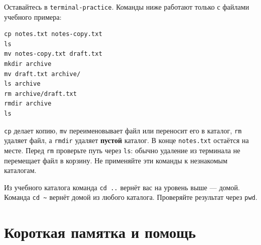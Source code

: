 Оставайтесь в \texttt{terminal-practice}. Команды ниже работают только с
файлами учебного примера:

\begin{verbatim}
cp notes.txt notes-copy.txt
ls
mv notes-copy.txt draft.txt
mkdir archive
mv draft.txt archive/
ls archive
rm archive/draft.txt
rmdir archive
ls
\end{verbatim}

\texttt{cp} делает копию, \texttt{mv} переименовывает файл или переносит
его в каталог, \texttt{rm} удаляет файл, а \texttt{rmdir} удаляет
\textbf{пустой} каталог. В конце \texttt{notes.txt} остаётся на месте.
Перед \texttt{rm} проверьте путь через \texttt{ls}: обычно удаление из
терминала не перемещает файл в корзину. Не применяйте эти команды к
незнакомым каталогам.

Из учебного каталога команда \texttt{cd\ ..} вернёт вас на уровень выше
--- домой. Команда \texttt{cd\ \textasciitilde{}} вернёт домой из любого
каталога. Проверяйте результат через \texttt{pwd}.

\hypertarget{ux43aux43eux440ux43eux442ux43aux430ux44f-ux43fux430ux43cux44fux442ux43aux430-ux438-ux43fux43eux43cux43eux449ux44c}{%
\section{Короткая памятка и
помощь}\label{ux43aux43eux440ux43eux442ux43aux430ux44f-ux43fux430ux43cux44fux442ux43aux430-ux438-ux43fux43eux43cux43eux449ux44c}}

